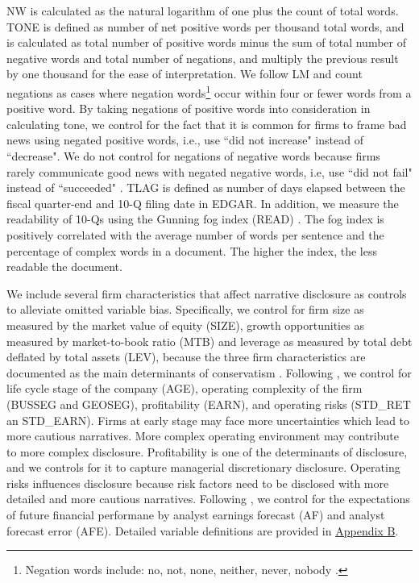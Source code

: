 \documentclass[letterpaper,11pt]{article}
\begin{document}
\begin{spacing}{1.5}
NW is calculated as the natural logarithm of one plus the count of total words. TONE is defined as number of net positive words per thousand total words, and is calculated as total number of positive words minus the sum of total number of negative words and total number of negations, and multiply the previous result by one thousand for the ease of interpretation. We follow LM and count negations as cases where negation words\footnote{Negation words include: no, not, none, neither, never, nobody \cite{tottieNegationEnglishSpeech1991}.} occur within four or fewer words from a positive word. By taking negations of positive words into consideration in calculating tone, we control for the fact that it is common for firms to frame bad news using negated positive words, i.e., use ``did not increase" instead of ``decrease". We do not control for negations of negative words because firms rarely communicate good news with negated negative words, i.e, use ``did not fail" instead of ``succeeded" \cite{loughranWhenLiabilityNot2011}. TLAG is defined as number of days elapsed between the fiscal quarter-end and 10-Q filing date in EDGAR. In addition, we measure the readability of 10-Qs using the Gunning fog index (READ) \cite{gunningTechniqueClearWriting1952, liAnnualReportReadability2008, loughranMeasuringReadabilityFinancial2014,  guayGuidingFogFinancial2016, loEarningsManagementAnnual2017, busheeLinguisticComplexityFirm2018}. The fog index is positively correlated with the average number of words per sentence and the percentage of complex words in a document. The higher the index, the less readable the document.

We include several firm characteristics that affect narrative disclosure as controls to alleviate omitted variable bias. Specifically, we control for firm size as measured by the market value of equity (SIZE), growth opportunities as measured by market-to-book ratio (MTB) and leverage as measured by total debt deflated by total assets (LEV), because the three firm characteristics are documented as the main determinants of conservatism \cite{wattsConservatismAccountingPart2003, qiangEffectsContractingLitigation2007, khanEstimationEmpiricalProperties2009, laraEconomicDeterminantsConditional2009}. Following , we control for life cycle stage of the company (AGE), operating complexity of the firm (BUSSEG and GEOSEG), profitability (EARN), and operating risks (STD\_RET an STD\_EARN). Firms at early stage may face more uncertainties which lead to more cautious narratives. More complex operating environment may contribute to more complex disclosure. Profitability is one of the determinants of disclosure, and we controls for it to capture managerial discretionary disclosure. Operating risks influences disclosure because risk factors need to be disclosed with more detailed and more cautious narratives. Following , we control for the expectations of future financial performane by analyst earnings forecast (AF) and analyst forecast error (AFE). Detailed variable definitions are provided in \hyperref[appb]{Appendix B}.


\end{spacing}
\end{document}
